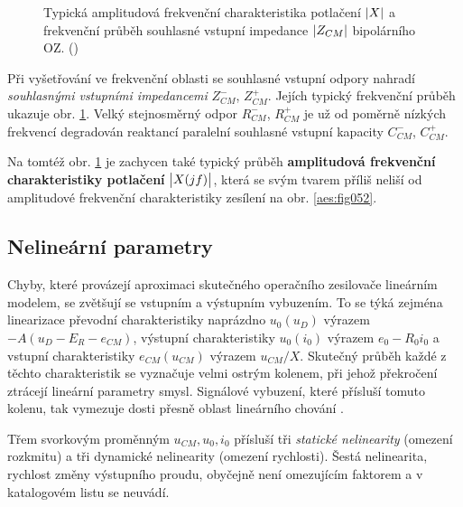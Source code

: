         \begin{figure}[ht!] %
          \centering
          \caption{Typická amplitudová frekvenční charakteristika potlačení \(\left\lvert X\right\rvert\) a frekvenční 
                   průběh souhlasné vstupní impedance \(\left\lvert Z_{CM}\right\rvert\) bipolárního OZ. 
                   (\cite[s.~29]{Dostal})}
          \label{aes:fig057}
        \end{figure} 

        Při vyšetřování ve frekvenční oblasti se souhlasné vstupní odpory nahradí \emph{souhlasnými
        vstupními impedancemi} \(Z_{CM}^-\), \(Z_{CM}^+\). Jejích typický frekvenční průběh ukazuje
        obr. \ref{aes:fig057}. Velký stejnosměrný odpor \(R_{CM}^-\), \(R_{CM}^+\) je už od poměrně
        nízkých frekvencí degradován reaktancí paralelní souhlasné vstupní kapacity \(C_{CM}^-\),
        \(C_{CM}^+\).

        Na tomtéž obr. \ref{aes:fig057} je zachycen také typický průběh \textbf{amplitudová
        frekvenční charakteristiky potlačení} \(\left\lvert X(jf)\right\rvert\), která se svým tvarem příliš neliší od
        amplitudové frekvenční charakteristiky zesílení na obr. \ref{aes:fig052}.
      
    
    \subsection{Nelineární parametry}\label{aesIchIIIsecIIssecVII}
      Chyby, které provázejí aproximaci skutečného operačního zesilovače lineár\-ním modelem, se 
      zvětšují se vstupním a výstupním vybuzením. To se týká zejména linearizace převodní 
      charakteristiky naprázdno $u_0(u_D)$ výrazem $-A(u_D-E_R-e_{CM})$, výstupní charakteristiky 
      $u_0(i_0)$ výrazem $e_0-R_0i_0$ a vstupní charakteristiky $e_{CM}(u_{CM})$ výrazem 
      $u_{CM}/X$.  Skutečný průběh každé z těchto charakteristik se vyznačuje velmi ostrým kolenem, 
      při jehož překročení ztrácejí lineární parametry smysl.  Signálové vybuzení, které přísluší 
      tomuto kolenu, tak vymezuje dosti přesně oblast lineárního chování \cite[s.~29]{Dostal}.
  
      Třem svorkovým proměnným $u_{CM}, u_0, i_0$ přísluší tři \emph{statické nelinearity} (omezení
      rozkmitu) a tři dynamické nelinearity (omezení rychlosti). Šestá nelinearita, rychlost změny
      výstupního proudu, obyčejně není omezujícím faktorem a v katalogovém listu se neuvádí.


